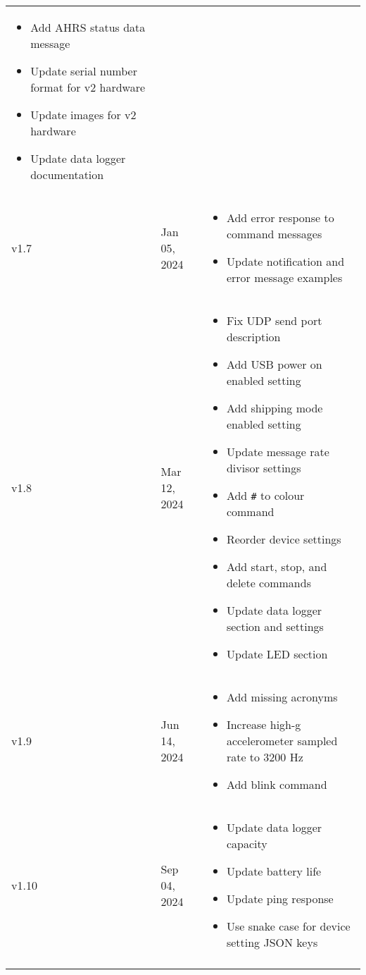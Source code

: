 \begin{longtable}{| >{\centering}p{} | p{} | >{\raggedright\arraybackslash}p{} |}
\begin{itemize}
        \item Add \ac{AHRS} status data message
        \item Update serial number format for v2 hardware
        \item Update images for v2 hardware
        \item Update data logger documentation
    \end{itemize}\\
    v1.7 & Jan 05, 2024 &
    \begin{itemize}
        \item Add error response to command messages
        \item Update notification and error message examples
    \end{itemize}\\
    v1.8 & Mar 12, 2024 &
    \begin{itemize}
        \item Fix \ac{UDP} send port description
        \item Add \ac{USB} power on enabled setting
        \item Add shipping mode enabled setting
        \item Update message rate divisor settings
        \item Add \texttt{\#} to colour command
        \item Reorder device settings
        \item Add start, stop, and delete commands
        \item Update data logger section and settings
        \item Update \ac{LED} section
    \end{itemize}\\
    v1.9 & Jun 14, 2024 &
    \begin{itemize}
        \item Add missing acronyms
        \item Increase high-g accelerometer sampled rate to 3200 Hz
        \item Add blink command
    \end{itemize}\\
    v1.10 & Sep 04, 2024 &
    \begin{itemize}
        \item Update data logger capacity
        \item Update battery life
        \item Update ping response
        \item Use snake case for device setting \ac{JSON} keys
    \end{itemize}\\    
    \arrayrulecolor{gray!50}\hline
\end{longtable}

